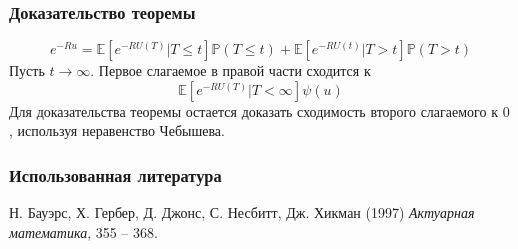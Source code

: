 \documentclass[10pt]{beamer}
\newcommand\E{\mathbb{E}}
\newcommand\Pro{\mathbb{P}}
\begin{document}
\begin{frame}
\frametitle{Доказательство теоремы}
\begin{equation}
e^{-Ru} = \E[e^{-RU(T)}|T \leq t]\Pro(T \leq t) + \E[e^{-RU(t)}|T > t]\Pro(T > t)
\end{equation}
Пусть $t \rightarrow \infty$. Первое слагаемое в правой части сходится к
\begin{equation}
\E[e^{-RU(T)}|T < \infty]\psi(u)
\end{equation}
\noindent
Для доказательства теоремы остается доказать сходимость второго слагаемого к $0$,
используя неравенство Чебышева.
\end{frame}


\begin{frame}
\frametitle{Использованная литература}
\footnotesize{
\begin{thebibliography}{99}
 Н. Бауэрс, Х. Гербер,
Д. Джонс, С. Несбитт, Дж. Хикман (1997)
\newblock \emph{Актуарная математика}, 355 -- 368.
\end{thebibliography}
}
\end{frame}
\end{document}
